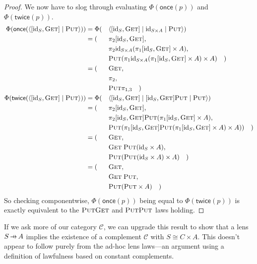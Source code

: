 \documentclass[11pt,a4paper]{article}
\theoremstyle{plain}
\theoremstyle{definition}
\newcommand{\C}{\mathscr{C}}
\newcommand{\id}{\mathrm{id}}
\newcommand{\rep}[2]{{\ensuremath \left\langle #1 \mid #2 \right\rangle}}
\newcommand{\repthree}[3]{{\ensuremath \langle #1 \mid #2 \mid #3 \rangle}}
\newcommand{\fget}{\textsc{Get}}
\newcommand{\fput}{\textsc{Put}}
\newcommand{\once}{\mathsf{once}}
\newcommand{\twice}{\mathsf{twice}}
\newcommand{\hto}{\ensuremath{\,\mathaccent\shortmid\rightarrow\,}}
\begin{document}
\begin{proof}
  We now have to slog through evaluating $\Phi(\once(p))$ and $\Phi(\twice(p))$.
  \begin{alignat*}{3}
    \Phi(\once(\rep{[\id_S, \fget]}{\fput})) &=
    \Phi(&&\repthree{[\id_S, \fget]}{\id_{S \times A}}{\fput}) \\
    &= (&&\pi_2 [\id_S, \fget], \\
    &&&\pi_2 \id_{S \times A} (\pi_1 [\id_S, \fget] \times A), \\
    &&& \fput (\pi_1 \id_{S \times A} (\pi_1 [\id_S, \fget] \times A) \times A) \quad) \\
    &= (&&\fget, \\
    &&& \pi_2, \\
    &&& \fput \pi_{1,3} \quad) \\
    \Phi(\twice(\rep{[\id_S, \fget]}{\fput})) &=
    \Phi(&&\repthree{[\id_S, \fget]}{[\id_S, \fget]\fput}{\fput}) \\
    &= (&&\pi_2 [\id_S, \fget], \\
    &&&\pi_2 [\id_S, \fget]\fput (\pi_1 [\id_S, \fget] \times A), \\
    &&& \fput (\pi_1 [\id_S, \fget]\fput (\pi_1 [\id_S, \fget] \times A) \times A)) \quad) \\
    &= (&&\fget, \\
    &&& \fget \; \fput (\id_S \times A), \\
    &&& \fput (\fput (\id_S \times A) \times A) \quad) \\
    &= (&&\fget, \\
    &&& \fget \; \fput, \\
    &&& \fput (\fput \times A) \quad)
  \end{alignat*}
  So checking componentwise, $\Phi(\once(p))$ being equal to $\Phi(\twice(p))$ is exactly equivalent to the $\fput\fget$ and $\fput\fput$ laws holding.
\end{proof}

If we ask more of our category $\C$, we can upgrade this result to show that a lens $S \hto A$ implies the existence of a complement $\C$ with $S \cong C \times A$. This doesn't appear to follow purely from the ad-hoc lens laws---an argument using a definition of lawfulness based on constant complements.
\end{document}
